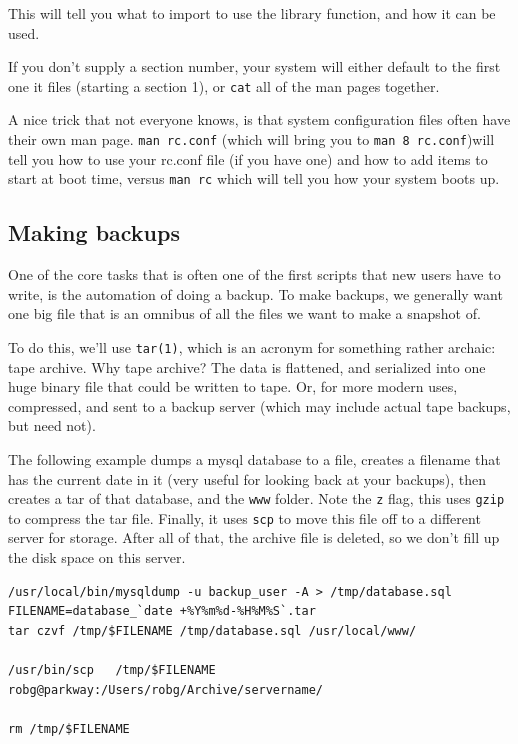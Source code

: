 This will tell you what to import to use the library function, and how it 
can be used.

If you don't supply a section number, your system will either default to the first one it files (starting a section 1), or {\tt cat}
all of the man pages together.

A nice trick that not everyone knows, is that system configuration files 
often have their own man page. {\tt man rc.conf} (which will bring you to {\tt man 8 rc.conf})will tell you 
how to use your rc.conf file (if you have one) and how to add items to start at boot time, versus {\tt man rc}
which will tell you how your system boots up.


\subsection {Making backups}

One of the core tasks that is often one of the first scripts that new users
have to write, is the automation of doing a backup. To make backups, we generally
want one big file that is an omnibus of all the files we want to make a snapshot
of.

To do this, we'll use {\tt tar(1)}, which is an acronym for something rather archaic:
tape archive. Why tape archive? The data is flattened, and serialized into one huge
binary file that could be written to tape. Or, for more modern uses, compressed, and
sent to a backup server (which may include actual tape backups, but need not).

The following example dumps a mysql database to a file, creates a filename that
has the current date in it (very useful for looking back at your backups), then
creates a tar of that database, and the {\tt www} folder. Note the {\tt z} flag,
this uses {\tt gzip} to compress the tar file. Finally, it uses
{\tt scp} to move this file off to a different server for storage.  After all of that,
the archive file is deleted, so we don't fill up the disk space on this server.

\begin{verbatim}
/usr/local/bin/mysqldump -u backup_user -A > /tmp/database.sql
FILENAME=database_`date +%Y%m%d-%H%M%S`.tar
tar czvf /tmp/$FILENAME /tmp/database.sql /usr/local/www/

/usr/bin/scp   /tmp/$FILENAME robg@parkway:/Users/robg/Archive/servername/

rm /tmp/$FILENAME
\end{verbatim}

